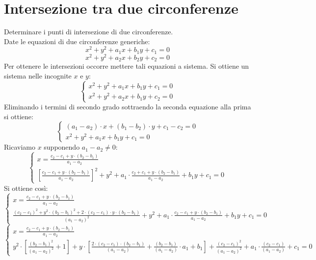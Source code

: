 \documentclass[12pt]{book}
\begin{document}
			\section{Intersezione tra due circonferenze}
			Determinare i punti di intersezione di due circonferenze.\\
			Date le equazioni di due circonferenze generiche:
			\[x^2+y^2+a_1x+b_1y+c_1=0\]
			\[x^2+y^2+a_2x+b_2y+c_2=0\]
			Per ottenere le intersezioni occorre mettere tali equazioni a sistema. Si ottiene un sistema nelle incognite $x$ e $y$:
			$$\begin{cases}
			x^2+y^2+a_1x+b_1y+c_1=0\\
			x^2+y^2+a_2x+b_1y+c_2=0
			\end{cases}$$
			Eliminando i termini di secondo grado sottraendo la seconda equazione alla prima si ottiene:
			$$\begin{cases}
				\left(a_1-a_2\right)\cdot x+\left(b_1-b_2\right)\cdot y+c_1-c_2=0\\
				x^2+y^2+a_1x+b_1y+c_1=0
			\end{cases}$$
			Ricaviamo $x$ supponendo $a_1-a_2\neq0$:
			$$\begin{cases}
				x=\frac{c_2-c_1+y\cdot\left(b_2-b_1\right)}
				{a_1-a_2}\\
				\left[\frac{c_2-c_1+y\cdot\left(b_2-b_1\right)}
				{a_1-a_2}\right]^2
				+y^2+a_1\cdot\frac{c_2+c_1+y\cdot(b_2-b_1)}
				{a_1-a_2}
				+b_1y+c_1=0
			\end{cases}$$
			Si ottiene così:
			$$\begin{cases}
				x=\frac{c_2-c_1+y\cdot\left(b_2-b_1\right)}
				{a_1-a_2}\\
				\frac{\left(c_2-c_1\right)^2+y^2\cdot\left(b_2-b_1\right)^2+2\cdot\left(c_2-c_1\right)\cdot y\cdot\left(b_2-b_1\right)}
				{\left(a_1-a_2\right)^2}
				+y^2+a_1\cdot\frac{c_2-c_1+y\cdot\left(b_2-b_1\right)}
				{a_1-a_2}
				+b_1y+c_1=0
			\end{cases}$$
			$$\begin{cases}
				x=\frac{c_2-c_1+y\cdot\left(b_2-b_1\right)}
				{a_1-a_2}\\
				y^2\cdot\left[\frac{\left(b_2-b_1\right)^2}
				{\left(a_1-a_2\right)^2}+1\right]
				+y\cdot\left[\frac{2\cdot\left(c_2-c_1\right)\cdot\left(b_2-b_1\right)}
				{\left(a_1-a_2\right)}
				+\frac{\left(b_2-b_1\right)}
				{\left(a_1-a_2\right)}\cdot a_1+b_1\right]
				+\frac{\left(c_2-c_1\right)^2}
				{\left(a_1-a_2\right)^2}
				+a_1\cdot\frac{\left(c_2-c_1\right)}
				{\left(a_1-a_2\right)}+c_1=0
			\end{cases}$$
\end{document}
